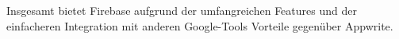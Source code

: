 
Insgesamt bietet Firebase aufgrund der umfangreichen Features und der einfacheren Integration mit anderen Google-Tools Vorteile gegenüber Appwrite. 


